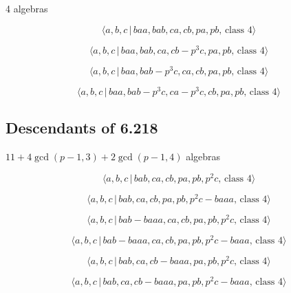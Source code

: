 \documentclass[10pt]{article}
\begin{document}
4 algebras

\begin{equation}
\langle a,b,c\,|\,baa,bab,ca,cb,pa,pb,\,\text{class }4\rangle  \tag{7.1922}
\end{equation}

\begin{equation}
\langle a,b,c\,|\,baa,bab,ca,cb-p^3c,pa,pb,\,\text{class }4\rangle 
\tag{7.1923}
\end{equation}

\begin{equation}
\langle a,b,c\,|\,baa,bab-p^3c,ca,cb,pa,pb,\,\text{class }4\rangle 
\tag{7.1924}
\end{equation}

\begin{equation}
\langle a,b,c\,|\,baa,bab-p^3c,ca-p^3c,cb,pa,pb,\,\text{class }4\rangle 
\tag{7.1925}
\end{equation}

\subsection{Descendants of 6.218}

$11+4\gcd (p-1,3)+2\gcd (p-1,4)$ algebras

\begin{equation}
\langle a,b,c\,|\,bab,ca,cb,pa,pb,p^2c,\,\text{class }4\rangle  \tag{7.1926}
\end{equation}

\begin{equation}
\langle a,b,c\,|\,bab,ca,cb,pa,pb,p^2c-baaa,\,\text{class }4\rangle 
\tag{7.1927}
\end{equation}

\begin{equation}
\langle a,b,c\,|\,bab-baaa,ca,cb,pa,pb,p^2c,\,\text{class }4\rangle 
\tag{7.1928}
\end{equation}

\begin{equation}
\langle a,b,c\,|\,bab-baaa,ca,cb,pa,pb,p^2c-baaa,\,\text{class }4\rangle 
\tag{7.1929}
\end{equation}

\begin{equation}
\langle a,b,c\,|\,bab,ca,cb-baaa,pa,pb,p^2c,\,\text{class }4\rangle 
\tag{7.1930}
\end{equation}

\begin{equation}
\langle a,b,c\,|\,bab,ca,cb-baaa,pa,pb,p^2c-baaa,\,\text{class }4\rangle 
\tag{7.1931}
\end{equation}
\end{document}

